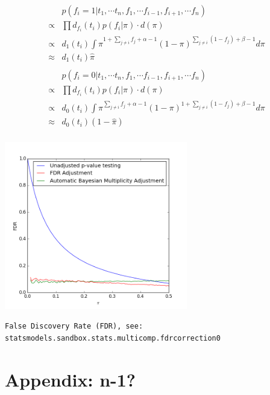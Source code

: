 \documentclass[11pt, oneside]{article}
\begin{document}
\begin{minipage}{.49\linewidth}
\begin{align*} 
     {}& p(f_i=1|t_1,\cdots t_n,f_1,\cdots f_{i-1},f_{i+1},\cdots f_{n}) \\
     \propto{}& \prod d_{f_i}(t_i)p(f_i|\pi) \cdot d(\pi) \\
    \propto{}& d_{1}(t_i) \int \pi^{1+\underset{j \not = i}{\sum}f_j + \alpha-1}(1-\pi)^{
    \underset{j \not = i}{\sum} (1-f_j) +  \beta-1} d\pi \\
    \approx{}& d_{1}(t_i)  \hat \pi \\
    {}\\
{}& p(f_i=0|t_1,\cdots t_n,f_1,\cdots f_{i-1},f_{i+1},\cdots f_{n})  \\
\propto{}& \prod d_{f_i}(t_i)p(f_i|\pi)  \cdot  d(\pi) \\
   \propto{}& d_{0}(t_i) \int \pi^{\underset{j \not = i}{\sum}f_j + \alpha-1}(1-\pi)^{
    1+\underset{j \not = i}{\sum} (1-f_j) +  \beta-1} d\pi   \\
      \approx{}& d_{0}(t_i)  (1-\hat \pi) \\
   \end{align*}
\end{minipage}
\begin{minipage}{.35\linewidth}
\includegraphics[width=3.15in]{bayesAutoMultAdj.png}
\end{minipage}

\begin{verbatim}
False Discovery Rate (FDR), see: statsmodels.sandbox.stats.multicomp.fdrcorrection0
\end{verbatim}

\section*{Appendix: n-1?}
\end{document}
